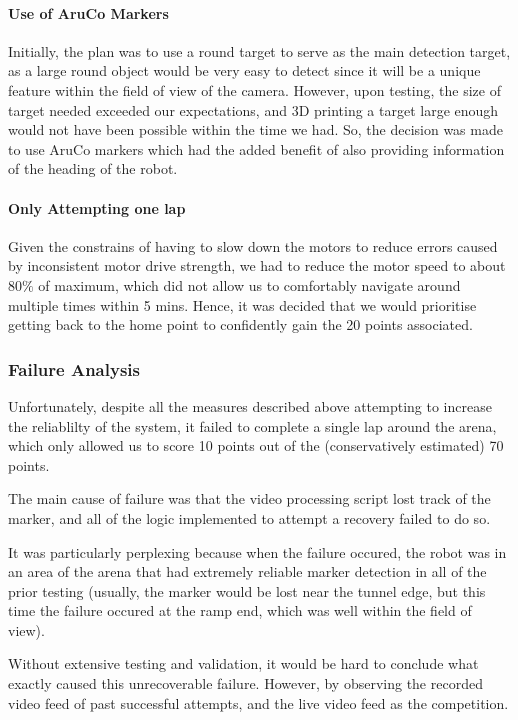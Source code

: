 \documentclass{article}
\begin{document}
\paragraph{Use of AruCo Markers}

Initially, the plan was to use a round target to serve as the main detection target, as a large round object would be very easy to detect since it will be a unique feature within the field of view of the camera. However, upon testing, the size of target needed exceeded our expectations, and 3D printing a target large enough would not have been possible within the time we had. So, the decision was made to use AruCo markers which had the added benefit of also providing information of the heading of the robot.

\paragraph{Only Attempting one lap}
Given the constrains of having to slow down the motors to reduce errors caused by inconsistent motor drive strength, we had to reduce the motor speed to about $80\%$ of maximum, which did not allow us to comfortably navigate around multiple times within 5 mins. Hence, it was decided that we would prioritise getting back to the home point to confidently gain the 20 points associated.

\subsubsection{Failure Analysis}
Unfortunately, despite all the measures described above attempting to increase the reliablilty of the system, it failed to complete a single lap around the arena, which only allowed us to score 10 points out of the (conservatively estimated) 70 points.

The main cause of failure was that the video processing script lost track of the marker, and all of the logic implemented to attempt a recovery failed to do so.

It was particularly perplexing because when the failure occured, the robot was in an area of the arena that had extremely reliable marker detection in all of the prior testing (usually, the marker would be lost near the tunnel edge, but this time the failure occured at the ramp end, which was well within the field of view).

Without extensive testing and validation, it would be hard to conclude what exactly caused this unrecoverable failure. However, by observing the recorded video feed of past successful attempts, and the live video feed as the competition.
\end{document}
